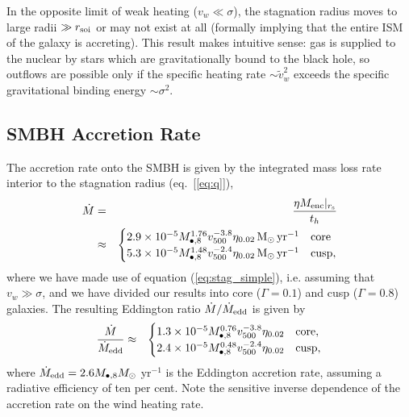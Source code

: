 \documentclass[usenatbib,fleqn]{mn2e}
\newcommand{\Menc}{M_{\rm enc}}
\newcommand{\Mbheight}{M_{\bullet,8}}
\newcommand{\pyear}{{\rm yr}^{-1}}
\renewcommand{\th}{t_h}
\begin{document}
In the opposite limit of weak heating ($v_{w} \ll \sigma$), the stagnation radius moves to large radii $\gg r_{\rm soi}$ or may not exist at all (formally implying that the entire ISM of the galaxy is accreting).  This result makes intuitive sense: gas is supplied to the nuclear by stars which are gravitationally bound to the black hole, so outflows are possible only if the specific heating rate $\sim \tilde{v}_{w}^{2}$ exceeds the specific gravitational binding energy $\sim \sigma^{2}$.


\subsection{SMBH Accretion Rate}

The accretion rate onto the SMBH is given by the integrated mass loss rate interior to the stagnation radius (eq.~[\ref{eq:q}]), 
\begin{eqnarray}
  \dot{M} &=& \frac{\eta \Menc|_{r_{\rm s}}}{\th} \nonumber \\
&\approx&
  \begin{cases}
    2.9 \times 10^{-5} M_{\bullet,8}^{1.76}
    v_{500}^{-3.8}  \eta_{0.02} \Msun \, \pyear& \text{core} \\
    5.3 \times 10^{-5} M_{\bullet,8}^{1.48} 
    v_{500}^{-2.4}  \eta_{0.02} \Msun \, \pyear  & \text{cusp}, 
  \end{cases}
  \label{eq:mdot_analytic}
\end{eqnarray}
where we have made use of equation (\ref{eq:stag_simple}), i.e. assuming that $v_{w} \gg \sigma$, and we have divided our results into core ($\Gamma = 0.1$) and cusp ($\Gamma = 0.8$) galaxies.  The resulting Eddington ratio $\dot{M}/\dot{M}_{\rm edd}$ is given by 
\begin{eqnarray}
\frac{\dot{M}}{\dot{M}_{\rm edd}} &\approx&
  \begin{cases}
    1.3 \times 10^{-5} M_{\bullet,8}^{0.76}
    v_{500}^{-3.8}  \eta_{0.02}   & \text{core}, \\
    2.4 \times 10^{-5} \Mbheight^{0.48} 
    v_{500}^{-2.4}  \eta_{0.02}   & \text{cusp}, 
  \end{cases}
  \label{eq:eddr_analytic}
\end{eqnarray}
where $\dot{M}_{\rm edd} = 2.6M_{\bullet,8}M_{\odot}$ yr$^{-1}$  is the Eddington accretion rate, assuming a radiative efficiency of ten per cent.  Note the sensitive inverse dependence of the accretion rate on the wind heating rate.  
\end{document}
